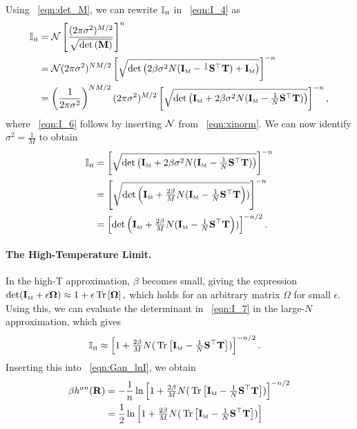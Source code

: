 %
Using \EQN~\ref{eqn:det_M}, we can rewrite $\mathbb{I}_{\text{\tiny H}}$ in \EQN~\ref{eqn:I_4} as
\begin{align}
\label{eqn:I_5}
\mathbb{I}_{\text{\tiny H}} &=   \mathcal{N}\left[\frac{(2\pi\sigma^{2})^{M/2}}{\sqrt{\mbox{}{\text{det}}\left( \mathbf{M}\right)}}\right]^{n} \\ \nonumber
    &=   \mathcal{N}(2\pi\sigma^2)^{NM/2}\left[
         \sqrt{\mbox{}{\text{det}}\left( 2\beta\sigma^2N(\mathbf{I}_{\text{\tiny M}}-\tfrac{1}{}{\mathbf{S}}^{\top}{\mathbf{T}})+\mathbf{I}_{\text{\tiny M}}\right)}\right]^{-n}  \\
\label{eqn:I_6}
   &=  \left( \frac{1}{2\pi\sigma^{2}} \right)^{N M/2}
       (2\pi \sigma^{2})^{M/2}
         \left[\sqrt{\mbox{}{\text{det}}\left( \mathbf{I}_{\text{\tiny M}} + 2\beta\sigma^{2}N(\mathbf{I}_{\text{\tiny M}}-\tfrac{1}{N}{\mathbf{S}}^{\top}{\mathbf{T}})\right)}\right]^{-n}  ,
\end{align}
where \EQN~\ref{eqn:I_6} follows by inserting $\mathcal{N}$ from \EQN~\ref{eqn:xinorm}.
We can now identify $\sigma^{2}=\tfrac{1}{M}$ to obtain
\begin{align}
\nonumber
\mathbb{I}_{\text{\tiny H}} &= \left[\sqrt{\mbox{}{\text{det}}\left( \mathbf{I}_{\text{\tiny M}} + 2\beta\sigma^{2}N(\mathbf{I}_{\text{\tiny M}}-\tfrac{1}{N}{\mathbf{S}}^{\top}{\mathbf{T}})\right)}\right]^{-n}   \\ 
\nonumber
    &= \left[\sqrt{\mbox{}{\text{det}}\left( \mathbf{I}_{\text{\tiny M}}  + \tfrac{2\beta}{M}N(\mathbf{I}_{\text{\tiny M}}-\tfrac{1}{N}{\mathbf{S}}^{\top}{\mathbf{T}}\right))}\right]^{-n} \\ 
\label{eqn:I_7}
    &= \left[\mbox{}{\text{det}}\left( \mathbf{I}_{\text{\tiny M}}  + \tfrac{2\beta}{M}N(\mathbf{I}_{\text{\tiny M}}-\tfrac{1}{N}{\mathbf{S}}^{\top}{\mathbf{T}}\right))\right]^{-n/2}  .
\end{align}

\paragraph{The High-Temperature Limit.}
In the high-T approximation, $\beta$ becomes small, giving the expression
$
\det(\mathbf{I}_{\text{\tiny M}}+\epsilon\mathbf{\Omega})\approx1+\epsilon\mbox{}\operatorname{Tr}\left[\mathbf{\Omega}\right]  ,
$
which holds for an arbitrary matrix $\Omega$ for small $\epsilon$.
Using this, we can evaluate the determinant in \EQN~\ref{eqn:I_7} in the large-$N$ approximation, 
which gives
\begin{align}
  \label{eqn:I_8}
  \mathbb{I}_{\text{\tiny H}} &\approx  \left[1  + \tfrac{2\beta}{M}N(\mbox{}\operatorname{Tr}\left[\mathbf{I}_{\text{\tiny M}}-\tfrac{1}{N}{\mathbf{S}}^{\top}{\mathbf{T}}\right])\right]^{-n/2}   .
\end{align}
Inserting this into \EQN~\ref{eqn:Gan_lnI}, we obtain
\begin{align}
\beta h^{an}(\mathbf{R})
   &=-\frac{1}{n}\ln \left[1  + \tfrac{2\beta}{M}N(\mbox{}\operatorname{Tr}\left[\mathbf{I}_{\text{\tiny M}}-\tfrac{1}{N}{\mathbf{S}}^{\top}{\mathbf{T}}\right])\right]^{-n/2}  \\ \nonumber
      &=\frac{1}{2}\ln \left[1  + \tfrac{2\beta}{M}N(\mbox{}\operatorname{Tr}\left[\mathbf{I}_{\text{\tiny M}}-\tfrac{1}{N}{\mathbf{S}}^{\top}{\mathbf{T}}\right])\right]
      \label{eqn:Gan_lnI_final_mwm}
\end{align}

